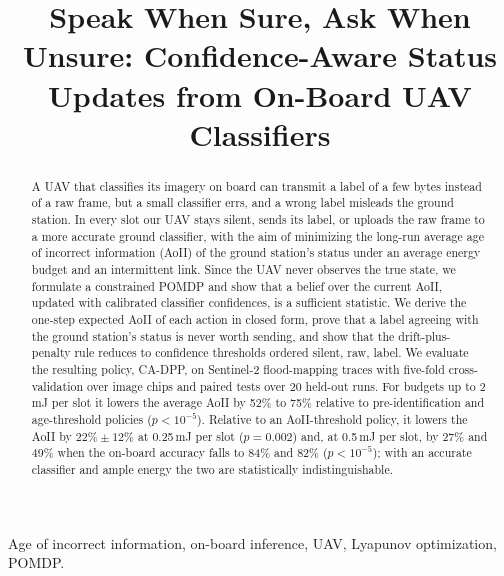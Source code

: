 \documentclass[conference]{IEEEtran}
\theoremstyle{remark}
\begin{document}
\title{Speak When Sure, Ask When Unsure: Confidence-Aware Status Updates from On-Board UAV Classifiers}

\author{
\and
{}
}

\maketitle

\begin{abstract}
A UAV that classifies its imagery on board can transmit a label of a few bytes instead of a raw frame, but a small classifier errs, and a wrong label misleads the ground station. In every slot our UAV stays silent, sends its label, or uploads the raw frame to a more accurate ground classifier, with the aim of minimizing the long-run average age of incorrect information (AoII) of the ground station's status under an average energy budget and an intermittent link. Since the UAV never observes the true state, we formulate a constrained POMDP and show that a belief over the current AoII, updated with calibrated classifier confidences, is a sufficient statistic. We derive the one-step expected AoII of each action in closed form, prove that a label agreeing with the ground station's status is never worth sending, and show that the drift-plus-penalty rule reduces to confidence thresholds ordered silent, raw, label. We evaluate the resulting policy, CA-DPP, on Sentinel-2 flood-mapping traces with five-fold cross-validation over image chips and paired tests over 20 held-out runs. For budgets up to 2\,mJ per slot it lowers the average AoII by 52\% to 75\% relative to pre-identification and age-threshold policies ($p<10^{-5}$). Relative to an AoII-threshold policy, it lowers the AoII by $22\%\pm12\%$ at 0.25\,mJ per slot ($p=0.002$) and, at 0.5\,mJ per slot, by 27\% and 49\% when the on-board accuracy falls to 84\% and 82\% ($p<10^{-5}$); with an accurate classifier and ample energy the two are statistically indistinguishable.
\end{abstract}

\begin{IEEEkeywords}
Age of incorrect information, on-board inference, UAV, Lyapunov optimization, POMDP.
\end{IEEEkeywords}
\end{document}
